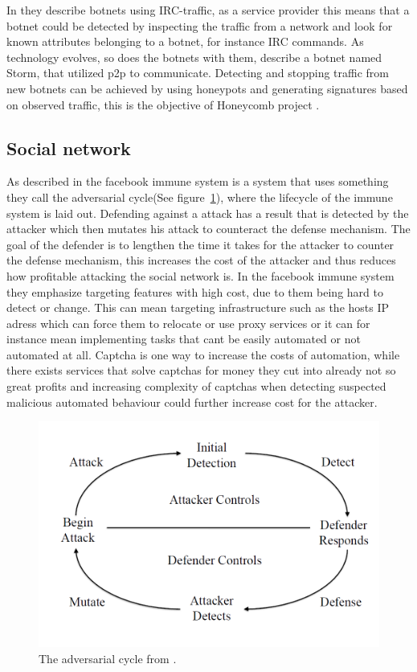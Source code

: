 In \cite{jan-usenix-botnet} they describe botnets using IRC-traffic, as a service provider this means that a botnet could be detected by inspecting the traffic from a network and look for known attributes belonging to a botnet, for instance IRC commands. As technology evolves, so does the botnets with them, \cite{jan_stone-gross} describe a botnet named Storm, that  utilized p2p to communicate. Detecting and stopping traffic from new botnets can be achieved by using honeypots and generating signatures based on observed traffic, this is the objective of Honeycomb project \cite{jan-Kreibich}.


\subsection{Social network}

As described in \cite{jan-fis} the facebook immune system is a system that uses something they call the adversarial cycle(See figure~\ref{jan-adv-cycle-fis}), where the lifecycle of the immune system is laid out.
Defending against a attack has a result that is detected by the attacker which then mutates his attack to counteract the defense mechanism. The goal of the defender is to lengthen the time it takes for the attacker to counter the defense mechanism, this increases the cost of the attacker and thus reduces how profitable attacking the social network is. In the facebook immune system they emphasize targeting features with high cost, due to them being hard to detect or change. This can mean targeting infrastructure such as the hosts IP adress which can force them to relocate or use proxy services or it can for instance mean implementing tasks that cant be easily automated or not automated at all. Captcha \cite{jan-captcha} is one way to increase the costs of automation, while there exists services that solve captchas for money they cut into already not so great profits \cite{jan-boshmaf} and increasing complexity of captchas when detecting suspected malicious automated behaviour could further increase cost for the attacker.


\begin{figure}
	\centering
	\includegraphics[scale=0.4]{fig/fis-adv-cycle}
	\caption{The adversarial cycle from \cite{jan-fis}.}
	\label{jan-adv-cycle-fis}
\end{figure}
